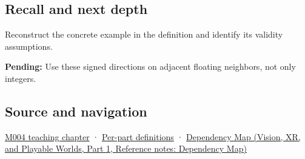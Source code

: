 \subsection{Recall and next depth}\label{appendix-637d164ae5ca-recall-and-next-depth}

\hypertarget{appendix-637d164ae5ca-recall-and-next-depth}{}

Reconstruct the concrete example in the definition and identify its validity assumptions.

\textbf{Pending:} Use these signed directions on adjacent floating neighbors, not only integers.

\subsection{Source and navigation}\label{appendix-637d164ae5ca-source-and-navigation}

\hypertarget{appendix-637d164ae5ca-source-and-navigation}{}

\hyperref[01-foundations-i-ch001-a-stretching-ruler-for-real-valued-quantities]{M004 teaching chapter} · \hyperref[appendix-fd090d982a15-m004---parts-61-76]{Per-part definitions} · \href{../07-Vision-XR-and-Playable-Worlds-P01/main.pdf\#nameddest=appendix-4ad47bdd269a}{Dependency Map (Vision, XR, and Playable Worlds, Part 1, Reference notes: Dependency Map)}
